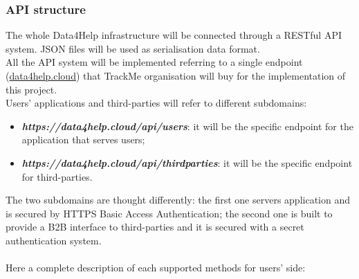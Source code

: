 \documentclass[DD.tex]{subfiles}
\begin{document}
\newpage

\subsubsection{API structure}
The whole Data4Help infrastructure will be connected through a RESTful API system. JSON files will be used as serialisation data format.\\
All the API system will be implemented referring to a single endpoint (\url{data4help.cloud}) that TrackMe organisation will buy for the implementation of this project.
\\Users' applications and third-parties will refer to different subdomains:

\begin{itemize}
	\item \textit{\textbf{https://data4help.cloud/api/users}}: it will be the specific endpoint for the application that serves users;
	\item \textit{\textbf{https://data4help.cloud/api/thirdparties}}: it will be the specific endpoint for third-parties.
\end{itemize}

The two subdomains are thought differently: the first one servers application and is secured by HTTPS Basic Access Authentication; the second one is built to provide a B2B interface to third-parties and it is secured with a secret authentication system.
\\\\
Here a complete description of each supported methods for users' side:
\end{document}
